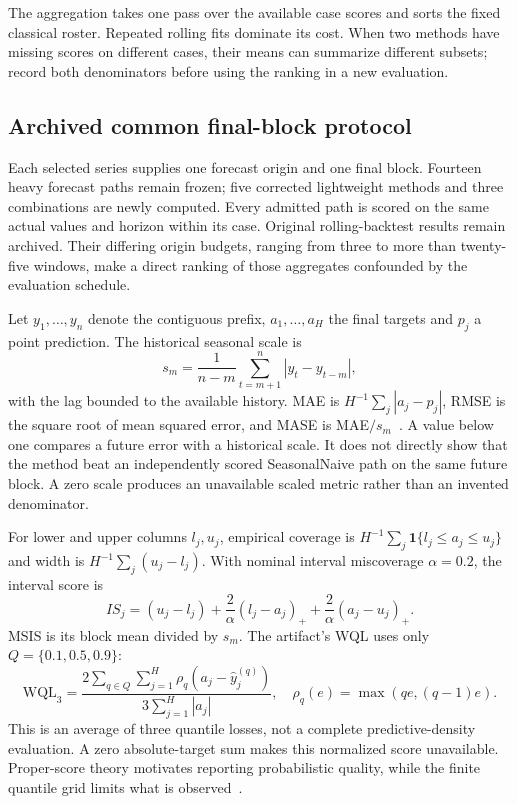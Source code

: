 \documentclass[11pt,a4paper]{article}
\begin{document}
The aggregation takes one pass over the available case scores and sorts the fixed classical roster. Repeated rolling fits dominate its cost. When two methods have missing scores on different cases, their means can summarize different subsets; record both denominators before using the ranking in a new evaluation.

\subsection{Archived common final-block protocol}
Each selected series supplies one forecast origin and one final block. Fourteen heavy forecast paths remain frozen; five corrected lightweight methods and three combinations are newly computed. Every admitted path is scored on the same actual values and horizon within its case. Original rolling-backtest results remain archived. Their differing origin budgets, ranging from three to more than twenty-five windows, make a direct ranking of those aggregates confounded by the evaluation schedule.

Let $y_1,\ldots,y_n$ denote the contiguous prefix, $a_1,\ldots,a_H$ the final targets and $p_j$ a point prediction. The historical seasonal scale is
\begin{equation}
s_m=\frac{1}{n-m}\sum_{t=m+1}^{n}|y_t-y_{t-m}|,
\end{equation}
with the lag bounded to the available history. MAE is $H^{-1}\sum_j|a_j-p_j|$, RMSE is the square root of mean squared error, and MASE is MAE$/s_m$~\cite{mase}. A value below one compares a future error with a historical scale. It does not directly show that the method beat an independently scored SeasonalNaive path on the same future block. A zero scale produces an unavailable scaled metric rather than an invented denominator.

For lower and upper columns $l_j,u_j$, empirical coverage is $H^{-1}\sum_j\mathbf1\{l_j\leq a_j\leq u_j\}$ and width is $H^{-1}\sum_j(u_j-l_j)$. With nominal interval miscoverage $\alpha=0.2$, the interval score is
\begin{equation}
IS_j=(u_j-l_j)+\frac{2}{\alpha}(l_j-a_j)_++\frac{2}{\alpha}(a_j-u_j)_+.
\end{equation}
MSIS is its block mean divided by $s_m$. The artifact's WQL uses only $Q=\{0.1,0.5,0.9\}$:
\begin{equation}
\mathrm{WQL}_3=\frac{2\sum_{q\in Q}\sum_{j=1}^H\rho_q(a_j-\widehat y_j^{(q)})}{3\sum_{j=1}^H|a_j|},\quad
\rho_q(e)=\max(qe,(q-1)e).
\end{equation}
This is an average of three quantile losses, not a complete predictive-density evaluation. A zero absolute-target sum makes this normalized score unavailable. Proper-score theory motivates reporting probabilistic quality, while the finite quantile grid limits what is observed~\cite{scores}.
\end{document}
